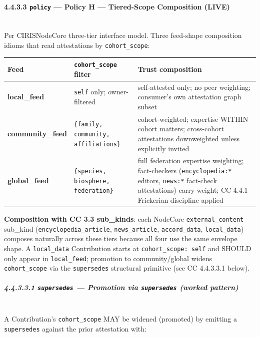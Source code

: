 \documentclass[11pt]{article}
\begin{document}
\paragraph{4.4.3.3 \texttt{policy} — Policy H — Tiered-Scope Composition (LIVE)}\mbox{}\\


Per CIRISNodeCore three-tier interface model. Three feed-shape composition idioms that read attestations by \texttt{cohort\_scope}:


{\footnotesize
\begin{longtable}{|p{5.33cm}|p{5.33cm}|p{5.33cm}|}\hline
\textbf{Feed} & \textbf{\texttt{cohort\_scope} filter} & \textbf{Trust composition} \\ \hline\endhead
\textbf{local\_feed} & \texttt{self} only; owner-filtered & self-attested only; no peer weighting; consumer's own attestation graph subset \\ \hline
\textbf{community\_feed} & \texttt{\{family, community, affiliations\}} & cohort-weighted; expertise WITHIN cohort matters; cross-cohort attestations downweighted unless explicitly invited \\ \hline
\textbf{global\_feed} & \texttt{\{species, biosphere, federation\}} & full federation expertise weighting; fact-checkers (\texttt{encyclopedia:*} editors, \texttt{news:*} fact-check attestations) carry weight; CC 4.4.1 Frickerian discipline applied \\ \hline
\end{longtable}}


\textbf{Composition with CC 3.3 sub\_kinds}: each NodeCore \texttt{external\_content} sub\_kind (\texttt{encyclopedia\_article}, \texttt{news\_article}, \texttt{accord\_data}, \texttt{local\_data}) composes naturally across these tiers because all four use the same envelope shape. A \texttt{local\_data} Contribution starts at \texttt{cohort\_scope: self} and SHOULD only appear in \texttt{local\_feed}; promotion to community/global widens \texttt{cohort\_scope} via the \texttt{supersedes} structural primitive (see CC 4.4.3.3.1 below).


\subparagraph{4.4.3.3.1 \texttt{supersedes} — Promotion via \texttt{supersedes} (worked pattern)}\mbox{}\\


A Contribution's \texttt{cohort\_scope} MAY be widened (promoted) by emitting a \texttt{supersedes} against the prior attestation with:
\end{document}
